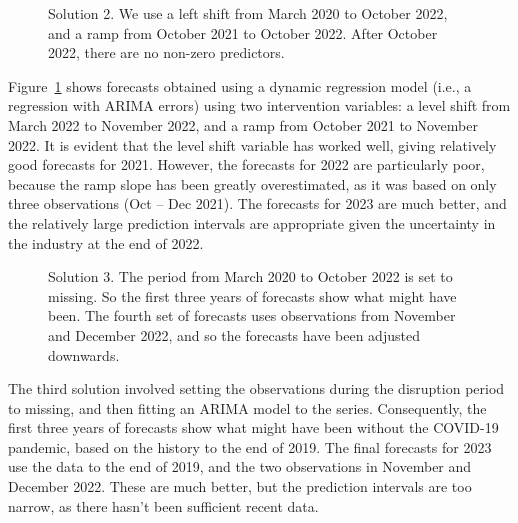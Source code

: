 \documentclass[11pt,a4paper,]{article}
\begin{document}
\begin{figure}[t]


\caption{\label{fig-tsol2-plot}Solution 2. We use a left shift from
March 2020 to October 2022, and a ramp from October 2021 to October
2022. After October 2022, there are no non-zero predictors.}

\end{figure}%

Figure~\ref{fig-tsol2-plot} shows forecasts obtained using a dynamic
regression model (i.e., a regression with ARIMA errors) using two
intervention variables: a level shift from March 2022 to November 2022,
and a ramp from October 2021 to November 2022. It is evident that the
level shift variable has worked well, giving relatively good forecasts
for 2021. However, the forecasts for 2022 are particularly poor, because
the ramp slope has been greatly overestimated, as it was based on only
three observations (Oct -- Dec 2021). The forecasts for 2023 are much
better, and the relatively large prediction intervals are appropriate
given the uncertainty in the industry at the end of 2022.

\begin{figure}[t]


\caption{\label{fig-tsol3-plot}Solution 3. The period from March 2020 to
October 2022 is set to missing. So the first three years of forecasts
show what might have been. The fourth set of forecasts uses observations
from November and December 2022, and so the forecasts have been adjusted
downwards.}

\end{figure}%

The third solution involved setting the observations during the
disruption period to missing, and then fitting an ARIMA model to the
series. Consequently, the first three years of forecasts show what might
have been without the COVID-19 pandemic, based on the history to the end
of 2019. The final forecasts for 2023 use the data to the end of 2019,
and the two observations in November and December 2022. These are much
better, but the prediction intervals are too narrow, as there hasn't
been sufficient recent data.
\end{document}
